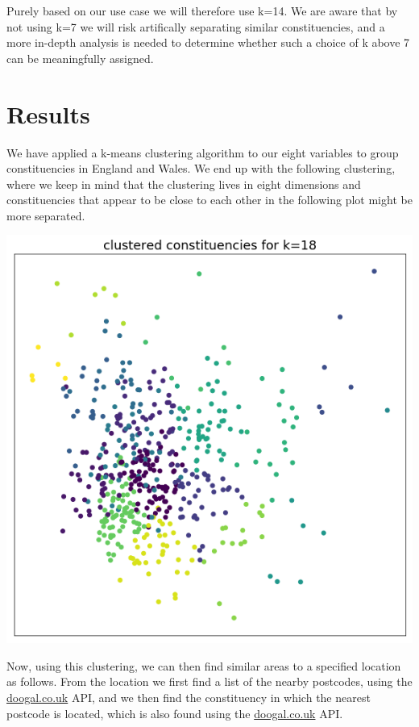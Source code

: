 \documentclass[a4paper, 11pt]{article}
\begin{document}
Purely based on our use case we will therefore use k=14. We are aware that by not using k=7 we will risk artifically separating similar constituencies, and a more in-depth analysis is needed to determine whether such a choice of k above 7 can be meaningfully assigned.

\section{Results}
We have applied a k-means clustering algorithm to our eight variables to group constituencies in England and Wales. We end up with the following clustering, where we keep in mind that the clustering lives in eight dimensions and constituencies that appear to be close to each other in the following plot might be more separated.

\begin{center}
  \includegraphics[scale=.40]{../gfx/cluster_colour.png}
\end{center}

Now, using this clustering, we can then find similar areas to a specified location as follows. From the location we first find a list of the nearby postcodes, using the \url{doogal.co.uk} API, and we then find the constituency in which the nearest postcode is located, which is also found using the \url{doogal.co.uk} API.
\end{document}
